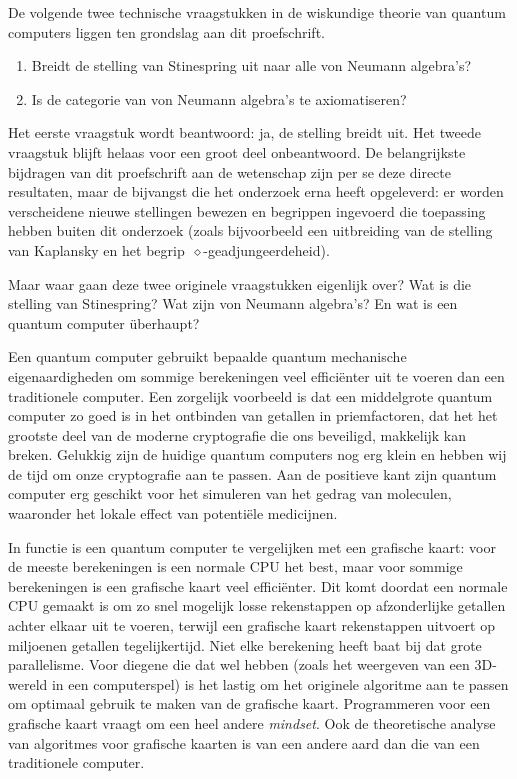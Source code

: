     
De volgende twee technische vraagstukken
    in de wiskundige theorie van quantum computers
    liggen ten grondslag aan dit proefschrift.
\begin{enumerate}
\item 
    Breidt de stelling van Stinespring uit naar
        alle von Neumann algebra's?
\item
    Is de categorie van von Neumann algebra's te axiomatiseren?
\end{enumerate}
Het eerste vraagstuk wordt beantwoord: ja, de stelling breidt uit.
Het tweede vraagstuk blijft helaas voor een groot deel onbeantwoord.
De belangrijkste bijdragen van dit proefschrift aan de wetenschap
    zijn per se deze directe resultaten,
    maar de bijvangst die het onderzoek erna heeft opgeleverd:
    er worden verscheidene nieuwe stellingen bewezen
        en begrippen ingevoerd
    die toepassing hebben buiten dit onderzoek
    (zoals bijvoorbeeld een uitbreiding van de stelling
        van Kaplansky en het begrip~$\diamond$-geadjungeerdeheid).

Maar waar gaan deze twee originele vraagstukken eigenlijk over?
Wat is die stelling van Stinespring?
Wat zijn von Neumann algebra's?
En wat is een quantum computer \"uberhaupt?

Een quantum computer gebruikt
       bepaalde quantum mechanische eigenaardigheden
    om sommige berekeningen veel effici\"enter uit
    te voeren dan een traditionele computer.
Een zorgelijk voorbeeld is
    dat een middelgrote quantum computer
    zo goed is in het ontbinden van getallen in priemfactoren,
    dat het het grootste deel van de moderne cryptografie die ons
    beveiligd, makkelijk kan breken.
Gelukkig zijn de huidige quantum computers nog erg klein
    en hebben wij de tijd om onze cryptografie aan te passen.
Aan de positieve kant zijn
    quantum computer erg geschikt voor het simuleren
    van het gedrag van moleculen,
    waaronder het lokale effect van potenti\"ele medicijnen.

In functie is een quantum computer te vergelijken met
        een grafische kaart:
    voor de meeste berekeningen is een normale CPU het best,
            maar voor sommige berekeningen
        is een grafische kaart veel effici\"enter.
Dit komt doordat een normale CPU gemaakt is om zo snel mogelijk
    losse rekenstappen op afzonderlijke getallen
    achter elkaar uit te voeren,
    terwijl een grafische kaart rekenstappen
    uitvoert op miljoenen getallen tegelijkertijd.
Niet elke berekening heeft baat bij dat grote parallelisme.
Voor diegene die dat wel hebben (zoals het
    weergeven van een 3D-wereld in een computerspel)
    is het lastig om het originele algoritme aan te passen
    om optimaal gebruik te maken van de grafische kaart.
    Programmeren voor een grafische kaart vraagt om een
    heel andere \emph{mindset}.
Ook de theoretische analyse van algoritmes voor grafische kaarten
    is van een andere aard dan die van een traditionele computer.

